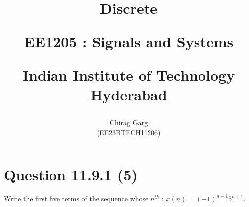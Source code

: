\documentclass[journal,12pt,twocolumn]{IEEEtran}
\theoremstyle{remark}
\begin{document}
%




\vspace{3cm}

\title{
Discrete

\large{EE1205 : Signals and Systems}

Indian Institute of Technology Hyderabad
}
\author{Chirag Garg

(EE23BTECH11206)
}	





\maketitle

\newpage



\bigskip

\renewcommand{\thefigure}{\theenumi}
\renewcommand{\thetable}{\theenumi}


\section{Question 11.9.1 (5)}
\vspace{0.5cm}
\begin{flushleft}
 Write the first five terms of the sequence whose $n^{th}$  : $x(n) = (-1)^{n-1}5^{n+1}$.
\end{flushleft} 
\end{document}
